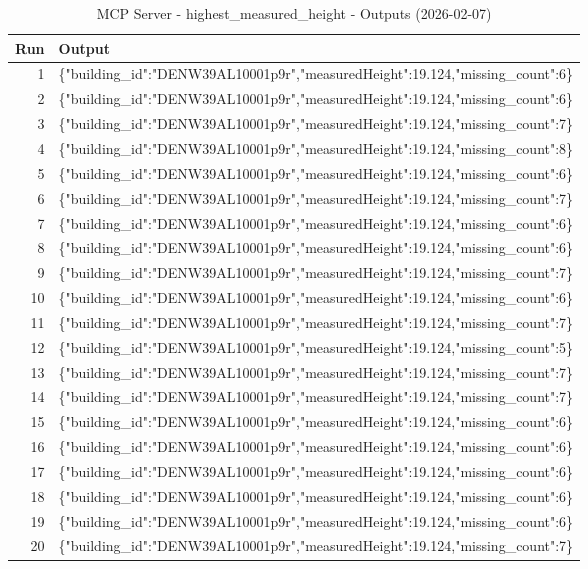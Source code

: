 \documentclass[a4paper,11pt]{article}
\begin{document}
\begin{table}[ht]
\centering
\scriptsize
\caption{MCP Server - highest\_measured\_height - Outputs (2026-02-07)}
\label{tab:mcp\_highest\_measured\_height\_outputs\_2026-02-07}
\begin{tabular}{r p{12cm}}
\hline
Run & Output \\
\hline
1 & \{"building\_id":"DENW39AL10001p9r","measuredHeight":19.124,"missing\_count":6\} \\
2 & \{"building\_id":"DENW39AL10001p9r","measuredHeight":19.124,"missing\_count":6\} \\
3 & \{"building\_id":"DENW39AL10001p9r","measuredHeight":19.124,"missing\_count":7\} \\
4 & \{"building\_id":"DENW39AL10001p9r","measuredHeight":19.124,"missing\_count":8\} \\
5 & \{"building\_id":"DENW39AL10001p9r","measuredHeight":19.124,"missing\_count":6\} \\
6 & \{"building\_id":"DENW39AL10001p9r","measuredHeight":19.124,"missing\_count":7\} \\
7 & \{"building\_id":"DENW39AL10001p9r","measuredHeight":19.124,"missing\_count":6\} \\
8 & \{"building\_id":"DENW39AL10001p9r","measuredHeight":19.124,"missing\_count":6\} \\
9 & \{"building\_id":"DENW39AL10001p9r","measuredHeight":19.124,"missing\_count":7\} \\
10 & \{"building\_id":"DENW39AL10001p9r","measuredHeight":19.124,"missing\_count":6\} \\
11 & \{"building\_id":"DENW39AL10001p9r","measuredHeight":19.124,"missing\_count":7\} \\
12 & \{"building\_id":"DENW39AL10001p9r","measuredHeight":19.124,"missing\_count":5\} \\
13 & \{"building\_id":"DENW39AL10001p9r","measuredHeight":19.124,"missing\_count":7\} \\
14 & \{"building\_id":"DENW39AL10001p9r","measuredHeight":19.124,"missing\_count":7\} \\
15 & \{"building\_id":"DENW39AL10001p9r","measuredHeight":19.124,"missing\_count":6\} \\
16 & \{"building\_id":"DENW39AL10001p9r","measuredHeight":19.124,"missing\_count":6\} \\
17 & \{"building\_id":"DENW39AL10001p9r","measuredHeight":19.124,"missing\_count":6\} \\
18 & \{"building\_id":"DENW39AL10001p9r","measuredHeight":19.124,"missing\_count":6\} \\
19 & \{"building\_id":"DENW39AL10001p9r","measuredHeight":19.124,"missing\_count":6\} \\
20 & \{"building\_id":"DENW39AL10001p9r","measuredHeight":19.124,"missing\_count":7\} \\
\hline
\end{tabular}
\end{table}
\end{document}
